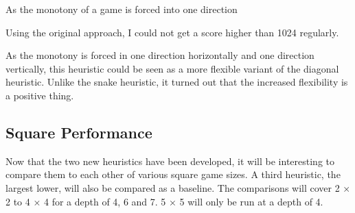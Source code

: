 \documentclass{article}
\begin{document}
As the monotony of a game is forced into one direction 

Using the original approach, I could not get a score higher than 1024 regularly.

As the monotony is forced in one direction horizontally and one direction vertically, this heuristic could be seen as a more flexible variant of the diagonal heuristic. Unlike the snake heuristic, it turned out that the increased flexibility is a positive thing.
\subsection{Square Performance}
Now that the two new heuristics have been developed, it will be interesting to compare them to each other of various square game sizes. A third heuristic, the largest lower, will also be compared as a baseline. The comparisons will cover 2 × 2 to 4 × 4 for a depth of 4, 6 and 7. 5 × 5 will only be run at a depth of 4. 
\end{document}
